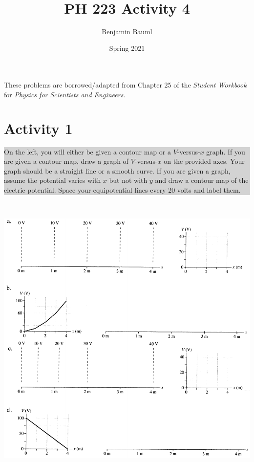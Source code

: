 \documentclass[]{article}
\title{PH 223 Activity 4}
\author{Benjamin Bauml}
\date{Spring 2021}
\newcommand{\excerpt}[1]{\colorbox{lightgray}{\parbox{14.8cm}{#1}} \\}
\begin{document}
\maketitle

\begin{center}
These problems are borrowed/adapted from Chapter 25 of the \textit{Student Workbook} for \textit{Physics for Scientists and Engineers}.
\end{center}
\section*{Activity 1}%
\excerpt{
On the left, you will either be given a contour map or a $ V $-versus-$ x $ graph. If you are given a contour map, draw a graph of $ V $-versus-$ x $ on the provided axes. Your graph should be a straight line or a smooth curve. If you are given a graph, assume the potential varies with $ x $ but not with $ y $ and draw a contour map of the electric potential. Space your equipotential lines every 20 volts and label them.
}
\begin{center}
	\includegraphics[scale=0.75]{A1}
\end{center}

\pagebreak
\end{document}
